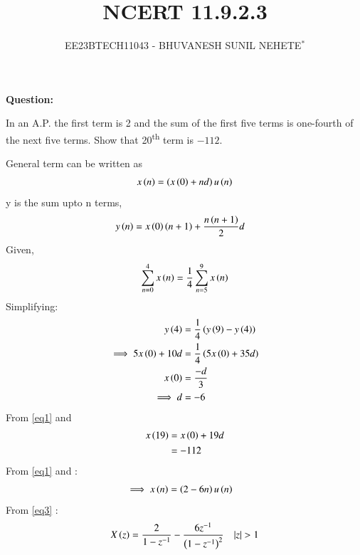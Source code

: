 \documentclass[journal,12pt,twocolumn]{IEEEtran}
\theoremstyle{remark}
\begin{document}

\vspace{3cm}

\title{NCERT 11.9.2.3}
\author{EE23BTECH11043 - BHUVANESH SUNIL NEHETE$^{*}$%
}
\maketitle
\newpage
\bigskip

\renewcommand{\thefigure}{\theenumi}
\renewcommand{\thetable}{\theenumi}



\textbf{Question:}

In an A.P. the first term is 2 and the sum of the first five terms is one-fourth of the next five terms. Show that 20\textsuperscript{th} term is $-112$.

\solution


General term can be written as
\begin{align}
    x\left(n\right) = \left(x\left(0\right) + nd\right)u\left(n\right)
\end{align}
y is the sum upto n terms,
    \begin{align}
        y\left(n\right) &= x\left(0\right)\left(n+1\right) + \frac{n\left(n+1\right)}{2}d
    \end{align}
Given, 
   \begin{align}
       \sum_{n=0}^{4}x\left(n\right) = \frac{1}{4}\sum_{n=5}^{9}x\left(n\right)
   \end{align}
Simplifying:
    \begin{align}
        y\left(4\right) &= \frac{1}{4}\left(y\left(9\right)-y\left(4\right)\right)\\
        \implies 5x\left(0\right) + 10d &= \frac{1}{4}\left(5x\left(0\right) + 35d\right)\\
        x\left(0\right) &= \frac{-d}{3}\\
        \implies d &= -6 \label{eq1}
    \end{align}
From \eqref{eq1} and 
    \begin{align}
        x\left(19\right)&=x\left(0\right)+19d\\ 
        &= -112
   \end{align} 
From \eqref{eq1} and :
    \begin{align}
        \implies x\left(n\right)&=\left(2-6n\right)u\left(n\right) \label{eq3}
    \end{align}    
From \eqref{eq3} :
    \begin{align}
        X\brak{z}=\frac{2}{1-z^{-1}} - \frac{6z^{-1}}{\brak{1-z^{-1}}^{2}} \quad |z|>1
    \end{align}
\end{document}
